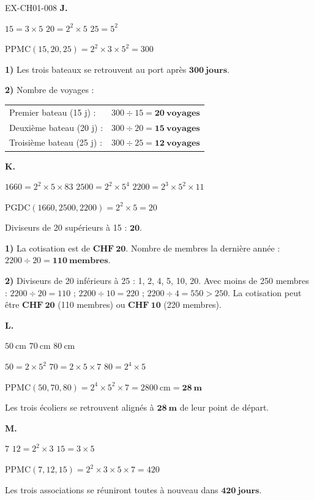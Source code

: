 \documentclass[12pt, a4paper]{article}
\begin{document}
\begin{solution}{EX-CH01-008}
\bigskip
\textbf{J.}

$15 = 3 \times 5$ \quad $20 = 2^2 \times 5$ \quad $25 = 5^2$

$\text{PPMC}(15, 20, 25) = 2^2 \times 3 \times 5^2 = 300$

\textbf{1)} Les trois bateaux se retrouvent au port après $\mathbf{300\ jours}$.

\textbf{2)} Nombre de voyages :

\begin{tabular}{ll}
Premier bateau (15 j) :  & $300 \div 15 = \mathbf{20\ voyages}$ \\[4pt]
Deuxième bateau (20 j) : & $300 \div 20 = \mathbf{15\ voyages}$ \\[4pt]
Troisième bateau (25 j) :& $300 \div 25 = \mathbf{12\ voyages}$ \\[4pt]
\end{tabular}

\bigskip
\textbf{K.}

$1660 = 2^2 \times 5 \times 83$ \quad $2500 = 2^2 \times 5^4$ \quad $2200 = 2^3 \times 5^2 \times 11$

$\text{PGDC}(1660, 2500, 2200) = 2^2 \times 5 = 20$

Diviseurs de 20 supérieurs à 15 : $\mathbf{20}$.

\textbf{1)} La cotisation est de $\mathbf{CHF\ 20}$. Nombre de membres la dernière année : $2200 \div 20 = \mathbf{110\ membres}$.

\textbf{2)} Diviseurs de 20 inférieurs à 25 : 1, 2, 4, 5, 10, 20. Avec moins de 250 membres : $2200 \div 20 = 110$ ; $2200 \div 10 = 220$ ; $2200 \div 4 = 550 > 250$. La cotisation peut être $\mathbf{CHF\ 20}$ (110 membres) ou $\mathbf{CHF\ 10}$ (220 membres).

\bigskip
\textbf{L.}

$50\ \text{cm}$ \quad $70\ \text{cm}$ \quad $80\ \text{cm}$

$50 = 2 \times 5^2$ \quad $70 = 2 \times 5 \times 7$ \quad $80 = 2^4 \times 5$

$\text{PPMC}(50, 70, 80) = 2^4 \times 5^2 \times 7 = 2800\ \text{cm} = \mathbf{28\ m}$

Les trois écoliers se retrouvent alignés à $\mathbf{28\ m}$ de leur point de départ.

\bigskip
\textbf{M.}

$7$ \quad $12 = 2^2 \times 3$ \quad $15 = 3 \times 5$

$\text{PPMC}(7, 12, 15) = 2^2 \times 3 \times 5 \times 7 = 420$

Les trois associations se réuniront toutes à nouveau dans $\mathbf{420\ jours}$.

\end{solution}
\end{document}
